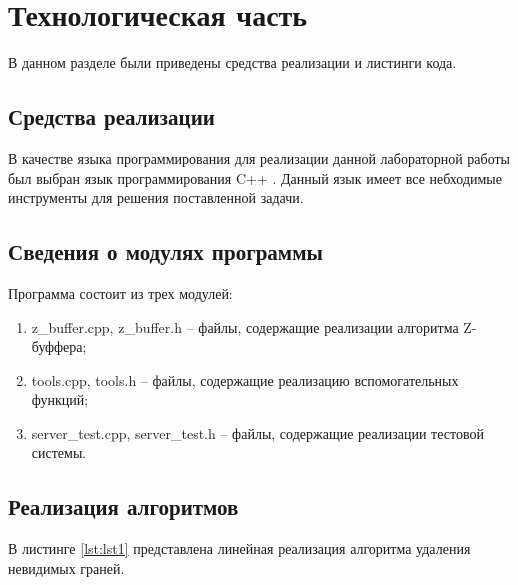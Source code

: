\chapter{Технологическая часть}

В данном разделе были приведены средства реализации и листинги кода.

\section{Средства реализации}

В качестве языка программирования для реализации данной лабораторной работы был выбран язык программирования C++ \cite{Cpp}.
Данный язык имеет все небходимые инструменты для решения поставленной задачи.

\section{Сведения о модулях программы}
Программа состоит из трех модулей:
\begin{enumerate}
	\item z\_buffer.cpp, z\_buffer.h -- файлы, содержащие реализации алгоритма Z-буффера;
	\item tools.cpp, tools.h -- файлы, содержащие реализацию вспомогательных функций;
	\item server\_test.cpp, server\_test.h -- файлы, содержащие реализации тестовой системы.
\end{enumerate}


\section{Реализация алгоритмов}
В листинге \ref{lst:lst1} представлена линейная реализация алгоритма удаления невидимых граней.

